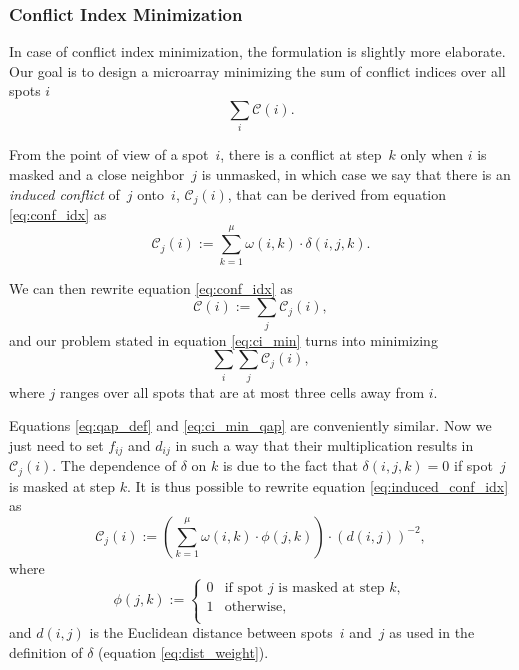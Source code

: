 \documentclass{bioinfo}
\begin{document}
\subsubsection{Conflict Index Minimization}

In case of conflict index minimization, the formulation is slightly more elaborate. Our goal is to design a microarray minimizing the sum of conflict indices over all spots $i$
\begin{equation}
\label{eq:ci_min}
\sum_{i} \mathcal{C}(i).
\end{equation}

From the point of view of a spot~$i$, there is a conflict at step~$k$ only when $i$ is masked and a close neighbor~$j$ is unmasked, in which case we say that there is an \emph{induced conflict} of~$j$ onto~$i$, $\mathcal{C}_{j}(i)$, that can be derived from equation \ref{eq:conf_idx} as
\begin{equation}
\label{eq:induced_conf_idx}
\mathcal{C}_{j}(i) := \sum_{k=1}^{\mu} \omega(i,k) \cdot \delta(i,j,k).
\end{equation}

We can then rewrite equation \ref{eq:conf_idx} as
\begin{equation}
\mathcal{C}(i) := \sum_{j} \mathcal{C}_{j}(i),
\end{equation}
and our problem stated in equation \ref{eq:ci_min} turns into minimizing
\begin{equation}
\label{eq:ci_min_qap}
\sum_{i} \sum_{j} \mathcal{C}_{j}(i),
\end{equation}
where $j$ ranges over all spots that are at most three cells away from $i$.

Equations \ref{eq:qap_def} and \ref{eq:ci_min_qap} are conveniently similar. Now we just need to set $f_{ij}$ and $d_{ij}$ in such a way that their multiplication results in $\mathcal{C}_{j}(i)$. The dependence of $\delta$ on $k$ is due to the fact that $\delta(i,j,k) = 0$ if spot~$j$ is masked at step $k$. It is thus possible to rewrite equation \ref{eq:induced_conf_idx} as
\begin{equation}
\label{eq:induced_conf_idx_2}
\mathcal{C}_{j}(i) := \left( \sum_{k=1}^{\mu} \omega(i,k) \cdot \phi(j,k) \right) \cdot (d(i,j))^{-2},
\end{equation}
where
\begin{equation}
\phi(j,k) :=
        \left\{
                \begin{array}{ll}
                        0 & \mbox{if spot $j$ is masked at step $k$}, \\
                        1 & \mbox{otherwise}, \\
                \end{array}
        \right.
\end{equation}
and $d(i,j)$ is the Euclidean distance between spots~$i$ and~$j$ as used in the definition of $\delta$ (equation \ref{eq:dist_weight}).
\end{document}
